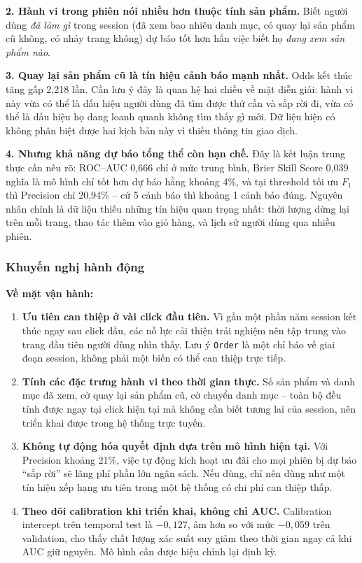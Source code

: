 \textbf{2. Hành vi trong phiên nói nhiều hơn thuộc tính sản phẩm.} Biết người
dùng \emph{đã làm gì} trong session (đã xem bao nhiêu danh mục, có quay lại sản
phẩm cũ không, có nhảy trang không) dự báo tốt hơn hẳn việc biết họ \emph{đang
xem sản phẩm nào}.

\textbf{3. Quay lại sản phẩm cũ là tín hiệu cảnh báo mạnh nhất.} Odds kết thúc
tăng gấp 2,218 lần. Cần lưu ý đây là quan hệ hai chiều về mặt diễn giải: hành vi
này vừa có thể là dấu hiệu người dùng đã tìm được thứ cần và sắp rời đi, vừa có
thể là dấu hiệu họ đang loanh quanh không tìm thấy gì mới. Dữ liệu hiện có không
phân biệt được hai kịch bản này vì thiếu thông tin giao dịch.

\textbf{4. Nhưng khả năng dự báo tổng thể còn hạn chế.} Đây là kết luận trung
thực cần nêu rõ: ROC--AUC 0,666 chỉ ở mức trung bình, Brier Skill Score 0,039
nghĩa là mô hình chỉ tốt hơn dự báo hằng khoảng 4\%, và tại threshold tối ưu
$F_1$ thì Precision chỉ 20,94\% -- cứ 5 cảnh báo thì khoảng 1 cảnh báo đúng.
Nguyên nhân chính là dữ liệu thiếu những tín hiệu quan trọng nhất: thời lượng
dừng lại trên mỗi trang, thao tác thêm vào giỏ hàng, và lịch sử người dùng qua
nhiều phiên.

\subsubsection{Khuyến nghị hành động}

\textbf{Về mặt vận hành:}

\begin{enumerate}
  \item \textbf{Ưu tiên can thiệp ở vài click đầu tiên.} Vì gần một phần năm
  session kết thúc ngay sau click đầu, các nỗ lực cải thiện trải nghiệm nên tập
  trung vào trang đầu tiên người dùng nhìn thấy. Lưu ý \texttt{Order} là một chỉ
  báo về giai đoạn session, không phải một biến có thể can thiệp trực tiếp.

  \item \textbf{Tính các đặc trưng hành vi theo thời gian thực.} Số sản phẩm và
  danh mục đã xem, cờ quay lại sản phẩm cũ, cờ chuyển danh mục -- toàn bộ đều
  tính được ngay tại click hiện tại mà không cần biết tương lai của session, nên
  triển khai được trong hệ thống trực tuyến.

  \item \textbf{Không tự động hóa quyết định dựa trên mô hình hiện tại.} Với
  Precision khoảng 21\%, việc tự động kích hoạt ưu đãi cho mọi phiên bị dự báo
  ``sắp rời'' sẽ lãng phí phần lớn ngân sách. Nếu dùng, chỉ nên dùng như một tín
  hiệu xếp hạng ưu tiên trong một hệ thống có chi phí can thiệp thấp.

  \item \textbf{Theo dõi calibration khi triển khai, không chỉ AUC.} Calibration
  intercept trên temporal test là $-0{,}127$, âm hơn so với mức $-0{,}059$ trên
  validation, cho thấy chất lượng xác suất suy giảm theo thời gian ngay cả khi
  AUC giữ nguyên. Mô hình cần được hiệu chỉnh lại định kỳ.
\end{enumerate}

